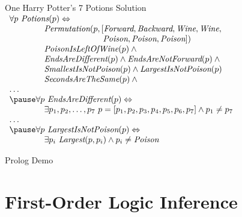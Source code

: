 \documentclass[12pt]{beamer}
\newcommand{\EM}[1]{\mbox{\em#1}}
\newcommand{\liff}{\Leftrightarrow}
\begin{document}
\begin{frame}{One Harry Potter's 7 Potions Solution}
	$
	\begin{array}{lll}
	\lefteqn{\forall p\ \EM{Potions}(p) \liff \mbox{}} \\
	& \EM{Permutation}(p, [\EM{Forward}, \EM{Backward}, \EM{Wine}, \EM{Wine}, \\
	& \hspace{7em}         \EM{Poison}, \EM{Poison}, \EM{Poison}]) \\
	& \EM{PoisonIsLeftOfWine}(p) \land \mbox{} \\
	& \EM{EndsAreDifferent}(p) \land \EM{EndsAreNotForward}(p) \land \mbox{} \\
	& \EM{SmallestIsNotPoison}(p) \land \EM{LargestIsNotPoison}(p) \\
	& \EM{SecondsAreTheSame}(p) \land \mbox{} \\
	\lefteqn{\ldots} \\
	\pause
	\lefteqn{\forall p\ \EM{EndsAreDifferent}(p) \liff \mbox{}} \\
	& \exists p_1, p_2, \ldots, p_7\ p = [p_1, p_2, p_3, p_4, p_5, p_6, p_7] \land p_1 \neq p_7 \\
	\lefteqn{\ldots} \\
	\pause
	\lefteqn{\forall p\ \EM{LargestIsNotPoison}(p) \liff \mbox{}} \\
	& \exists p_i\ \EM{Largest}(p, p_i) \land p_i \neq \EM{Poison}
	\end{array}
	$
\end{frame}
\begin{frame}
	\begin{center}
		\Huge Prolog Demo
	\end{center}
\end{frame}

\section{First-Order Logic Inference}
\end{document}
